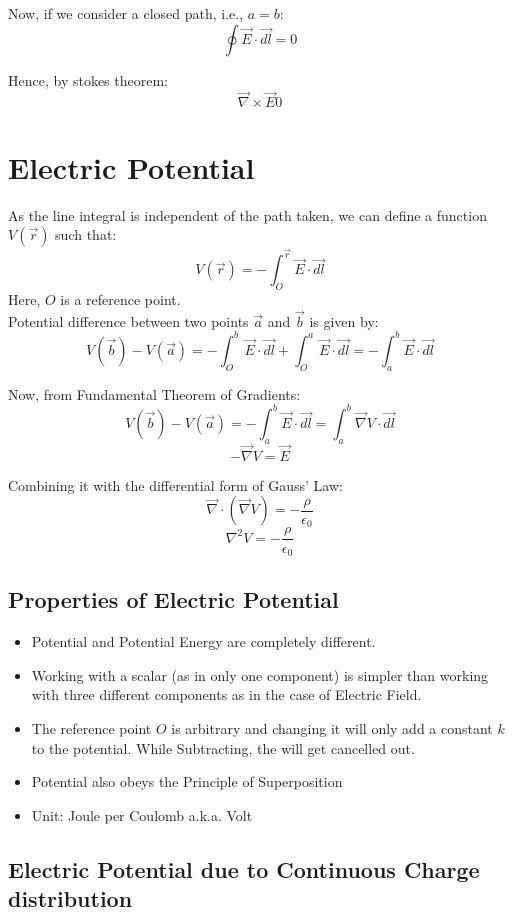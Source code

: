 \documentclass{article}
\begin{document}
Now, if we consider a closed path, i.e., $a = b$:
\[ \oint \vec{E} \cdot \vec{dl} = 0 \]

Hence, by stokes theorem:
\[ \vec{\nabla} \times \vec{E} 0 \]

\section{Electric Potential}
As the line integral is independent of the path taken, we can define a function $V(\vec{r})$ such that:
\[ V(\vec{r}) = -\int_{O}^{\vec{r}} \vec{E}\cdot \vec{dl} \]
Here, $O$ is a reference point.\\

Potential difference between two points $\vec{a}$ and $\vec{b}$ is given by:
\[ V(\vec{b}) - V(\vec{a}) = -\int_{O}^{b} \vec{E} \cdot \vec{dl} + \int_{O}^{a} \vec{E} \cdot \vec{dl} =-\int_{a}^{b} \vec{E} \cdot \vec{dl} \]

Now, from Fundamental Theorem of Gradients:
\[  V(\vec{b}) - V(\vec{a}) = - \int_{a}^{b} \vec{E} \cdot \vec{dl} = \int_{a}^{b} \vec{\nabla} V \cdot \vec{dl} \]
\[ - \vec{\nabla}V = \vec{E} \]

Combining it with the differential form of Gauss' Law:
\[\vec{\nabla} \cdot \left(\vec{\nabla}V\right) = -\frac{\rho}{\epsilon_0} \]
\[ \nabla^2 V = -\frac{\rho}{\epsilon_0} \]

\subsection{Properties of Electric Potential}
\begin{itemize}
    \item Potential and Potential Energy are completely different. 
    \item Working with a scalar (as in only one component) is simpler than working with three different components as in the case of Electric Field.
    \item The reference point $O$ is arbitrary and changing it will only add a constant $k$ to the potential.
    While Subtracting, the will get cancelled out.
    \item Potential also obeys the Principle of Superposition
    \item Unit: Joule per Coulomb a.k.a. Volt
\end{itemize}

\subsection{Electric Potential due to Continuous Charge distribution}
\end{document}
